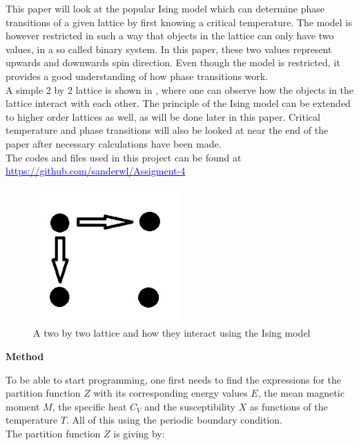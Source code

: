 \documentclass[10pt,a4paper]{article}
\begin{document}
\noindent This paper will look at the popular Ising model which can determine phase transitions of a given lattice by first knowing a critical temperature. The model is however restricted in such a way that objects in the lattice can only have two values, in a so called binary system. In this paper, these two values represent upwards and downwards spin direction. Even though the model is restricted, it provides a good understanding of how phase transitions work.
\\
A simple 2 by 2 lattice is shown in , where one can observe how the objects in the lattice interact with each other. The principle of the Ising model can be extended to higher order lattices as well, as will be done later in this paper. Critical temperature and phase transitions will also be looked at near the end of the paper after necessary calculations have been made.
\\
The codes and files used in this project can be found at \href{https://github.com/sanderwl/Assigment-4}{\textcolor{blue}{https://github.com/sanderwl/Assigment-4}}

\begin{figure}[H]
\centering
\includegraphics[width=0.5\textwidth]{22lattice}
\caption{A two by two lattice and how they interact using the Ising model}
\label{fig:22lattice}
\end{figure}




\newpage

\begin{center}
{\LARGE\bf Method}
\end{center}

\noindent To be able to start programming, one first needs to find the expressions for the partition function $Z$ with its corresponding energy values $E$, the mean magnetic moment $M$, the specific heat $C_V$ and the susceptibility $X$ as functions of the temperature $T$. All of this using the periodic boundary condition.
\\
The partition function $Z$ is giving by: 
\end{document}
